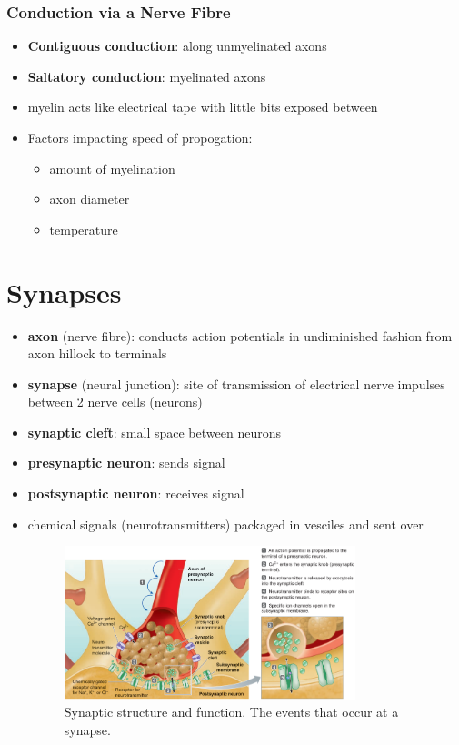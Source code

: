 \documentclass[10pt]{article}
\begin{document}
\subsubsection*{Conduction via a Nerve Fibre}
\begin{itemize}
    \item \textbf{Contiguous conduction}: along unmyelinated axons 
    \item \textbf{Saltatory conduction}: myelinated axons
    \item myelin acts like electrical tape with little bits exposed between
    \item Factors impacting speed of propogation:
        \begin{itemize}
            \item amount of myelination
            \item axon diameter
            \item temperature
        \end{itemize}
\end{itemize}




\section{Synapses}
\begin{itemize}
    \item \textbf{axon} (nerve fibre): conducts action potentials in undiminished fashion from axon hillock to terminals
    \item \textbf{synapse} (neural junction): site of transmission of electrical nerve impulses between 2 nerve cells (neurons)
    \item \textbf{synaptic cleft}: small space between neurons
    \item \textbf{presynaptic neuron}: sends signal
    \item \textbf{postsynaptic neuron}: receives signal
    \item chemical signals (neurotransmitters) packaged in vesciles and sent over
        \begin{figure}[h]
            \centering
            \includegraphics[width=0.8\textwidth]{synapticStructureAndFunction}
            \caption{Synaptic structure and function. The events that occur at a synapse.}
            \label{fig:}
        \end{figure}
\end{itemize}
\end{document}
